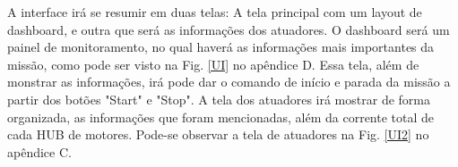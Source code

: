 A interface irá se resumir em duas telas: A tela principal com um layout de dashboard, e outra que será as informações dos atuadores. O dashboard será um painel de monitoramento, no qual haverá as informações mais importantes da missão, como pode ser visto na Fig. \ref{UI} no apêndice D. Essa tela, além de monstrar as informações, irá pode dar o comando de início e parada da missão a partir dos botões "Start" e "Stop". A tela dos atuadores irá mostrar de forma organizada, as informações que foram mencionadas, além da corrente total de cada HUB de motores. Pode-se observar a tela de atuadores na Fig. \ref{UI2} no apêndice C.

\label{ssec:arqs}



